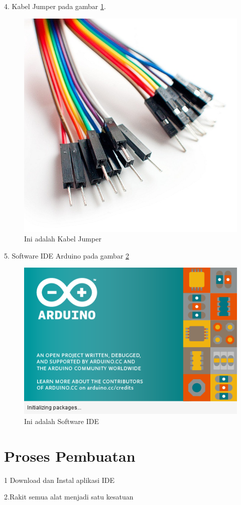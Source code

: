  4. Kabel Jumper pada gambar \ref{fig:jumper}.
  \begin{figure}[ht]
  \centerline{\includegraphics[width=.75\textwidth]{figures/jumper.jpg}}
  \caption{Ini adalah Kabel Jumper}
  \label{fig:jumper}
  \end{figure}

 5. Software IDE Arduino pada gambar \ref{fig:ide}
  \begin{figure}[ht]
  \centerline{\includegraphics[width=.75\textwidth]{figures/ide.png}}
  \caption{Ini adalah Software IDE}
  \label{fig:ide}
  \end{figure}


\section{Proses Pembuatan}

1 Download dan Instal aplikasi IDE 

2.Rakit semua alat menjadi satu kesatuan 

